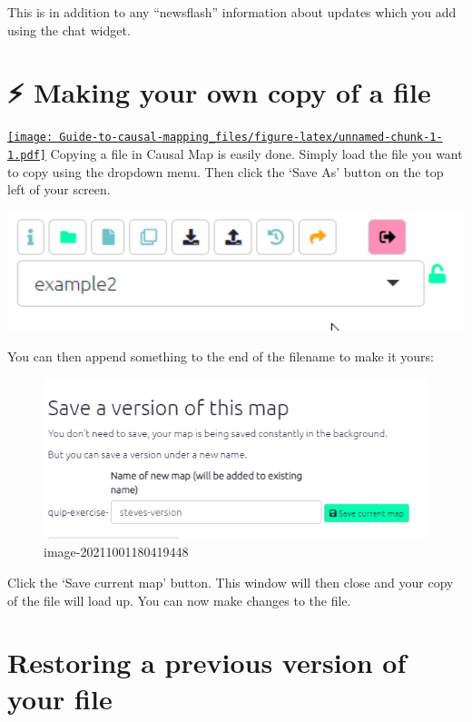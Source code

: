\documentclass[
]{book}
\begin{document}
This is in addition to any ``newsflash'' information about updates which you add using the chat widget.

\hypertarget{xown-copy}{%
\section{⚡ Making your own copy of a file}\label{xown-copy}}

\href{https://player.vimeo.com/video/641927229}{\texttt{[image: Guide-to-causal-mapping\_files/figure-latex/unnamed-chunk-1-1.pdf]}}
Copying a file in Causal Map is easily done. Simply load the file you want to copy using the dropdown menu. Then click the `Save As' button on the top left of your screen.

\includegraphics[width=6.77083in,height=\textheight]{_assets/5Najfi4Pr2.gif}

You can then append something to the end of the filename to make it yours:

\begin{figure}
\centering
\includegraphics[width=6.77083in,height=\textheight]{_assets/image-20211001180419448.png}
\caption{image-20211001180419448}
\end{figure}

Click the `Save current map' button. This window will then close and your copy of the file will load up. You can now make changes to the file.

\hypertarget{restoring-a-previous-version-of-your-file}{%
\section{Restoring a previous version of your file}\label{restoring-a-previous-version-of-your-file}}
\end{document}
